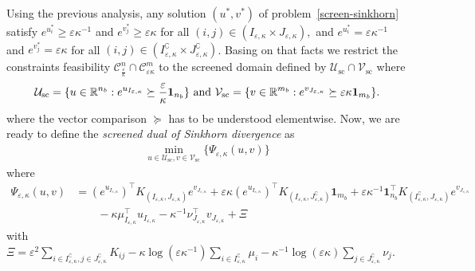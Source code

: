 Using the previous analysis, any solution $(u^*, v^*)$ of problem~\eqref{screen-sinkhorn} satisfy $e^{u^*_i} \geq \varepsilon\kappa^{-1}$ and $e^{v^*_j} \geq \varepsilon\kappa$ for all $(i,j) \in (I_{\varepsilon,\kappa}\times J_{\varepsilon,\kappa}),$ and $e^{u^*_i} = \varepsilon\kappa^{-1}$ and $e^{v^*_j} = \varepsilon\kappa$ for all $(i,j) \in (I^\complement_{\varepsilon,\kappa}\times J^\complement_{\varepsilon,\kappa})$.
Basing on that facts we restrict the constraints feasibility $\mathcal{C}^n_{\frac \varepsilon \kappa} \cap \mathcal{C}^m_{\varepsilon\kappa}$ to the screened domain defined by $\mathcal{U}_{\text{sc}} \cap \mathcal{V}_{\text{sc}}$ where 
\begin{equation*}
\mathcal{U}_{\text{sc}} = \{u \in \R^{n_b}: e^{u_{I_{\varepsilon,\kappa}}} \succeq \frac \varepsilon\kappa\mathbf 1_{n_b}\} \text{ and } \mathcal{V}_{\text{sc}} =\{v\in\R^{m_b}: e^{v_{J_{\varepsilon,\kappa}}} \succeq \varepsilon\kappa \mathbf{1}_{m_b}\}.%
\end{equation*}
where the vector comparison $\succeq$ has to be understood elementwise.
Now, we are ready to define the \emph{screened dual of Sinkhorn divergence} as
\begin{align}
\label{screen-sinkhorn_second_def}
\min_{u \in \mathcal{U}_{\text{sc}}, v \in \mathcal{V}_{\text{sc}}}\{\Psi_{\varepsilon, \kappa}(u,v)\}
\end{align}
where 
\begin{align*} 
\Psi_{\varepsilon,\kappa}(u, v) &= (e^{u_{I_{\varepsilon,\kappa}}})^\top K_{(I_{\varepsilon,\kappa}, J_{\varepsilon,\kappa})} e^{v_{J_{\varepsilon,\kappa}}} + 
\varepsilon \kappa (e^{u_{I_{\varepsilon,\kappa}}})^\top K_{(I_{\varepsilon,\kappa}, J^\complement_{\varepsilon,\kappa})}\mathbf 1_{m_b} + \varepsilon \kappa^{-1} \mathbf 1_{n_b}^\top K_{(I^\complement_{\varepsilon,\kappa}, J_{\varepsilon,\kappa})}e^{v_{J_{\varepsilon,\kappa}}}\\
&\qquad - \kappa \mu_{I_{\varepsilon,\kappa}}^\top u_{I_{\varepsilon,\kappa}} - \kappa^{-1} \nu_{J_{\varepsilon,\kappa}}^\top v_{J_{\varepsilon,\kappa}} + \Xi
\end{align*}
with $\Xi = \varepsilon^2 \sum_{i \in I^\complement_{\varepsilon,\kappa}, j \in J^\complement_{\varepsilon,\kappa}} K_{ij} -\kappa \log(\varepsilon\kappa^{-1})\sum_{i \in I^\complement_{\varepsilon,\kappa}}\mu_i - \kappa^{-1} \log(\varepsilon\kappa)\sum_{j\in J^\complement_{\varepsilon,\kappa}} \nu_j$.

